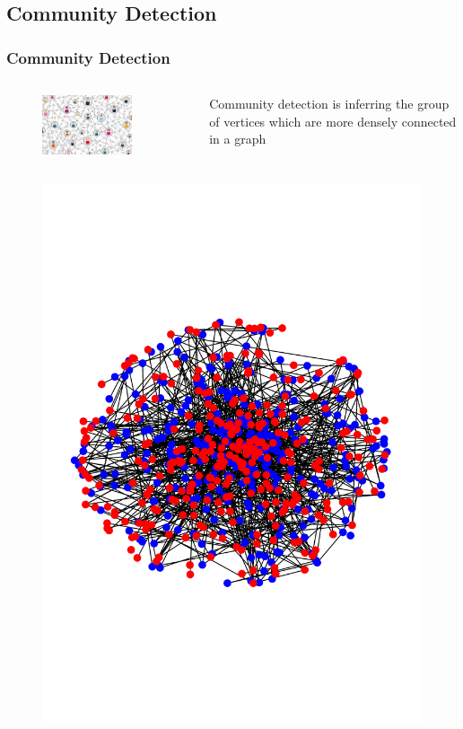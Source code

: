 \documentclass[notheorems]{beamer}
\begin{document}
\begin{frame}
\subsection{Community Detection}
\frametitle{Community Detection}
\begin{columns}
	\begin{figure}
		\includegraphics[width=0.8\textwidth]{cd.png}
	\end{figure}
Community detection is inferring the group of vertices which are more
densely connected in a graph
\end{columns}
\begin{columns}
	\begin{figure}
		\includegraphics[width=\textwidth]{benno2t.pdf}

\end{figure}
\end{columns}
\end{frame}
\end{document}
